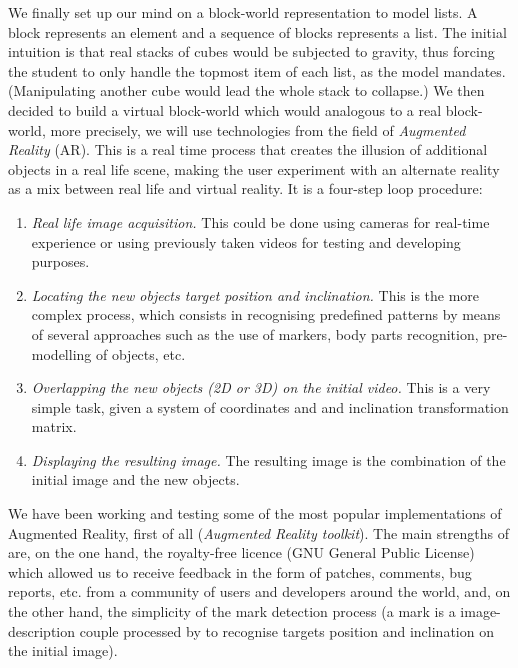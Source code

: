 We finally set up our mind on a block\hyp{}world representation to
model lists. A block represents an element and a sequence of blocks
represents a list. The initial intuition is that real stacks of cubes
would be subjected to gravity, thus forcing the student to only handle
the topmost item of each list, as the model mandates. (Manipulating
another cube would lead the whole stack to collapse.) We then decided
to build a virtual block\hyp{}world which would analogous to a real
block\hyp{}world, more precisely, we will use technologies from the
field of \emph{Augmented Reality} (AR). This is a real time process
that creates the illusion of additional objects in a real life scene,
making the user experiment with an alternate reality as a mix between
real life and virtual reality. It is a four\hyp{}step loop procedure:
\begin{enumerate}
	
	\item \emph{Real life image acquisition.} This could be done using
      cameras for real\hyp{}time experience or using previously taken
      videos for testing and developing purposes.
	
	\item \emph{Locating the new objects target position and
      inclination.} This is the more complex process, which consists
      in recognising predefined patterns by means of several
      approaches such as the use of markers, body parts recognition,
      pre\hyp{}modelling of objects, etc.
	
	\item \emph{Overlapping the new objects (2D or 3D) on the initial
      video.} This is a very simple task, given a system of
      coordinates and and inclination transformation matrix.
	
	\item \emph{Displaying the resulting image.} The resulting image
      is the combination of the initial image and the new objects.
	
\end{enumerate}
We have been working and testing some of the most popular
implementations of Augmented Reality, first of all \ARtoolkit
(\emph{Augmented Reality toolkit}). The main strengths of \ARtoolkit
are, on the one hand, the royalty\hyp{}free licence (GNU General
Public License) which allowed us to receive feedback in the form of
patches, comments, bug reports, etc. from a community of users and
developers around the world, and, on the other hand, the simplicity of
the mark detection process (a mark is a image\hyp{}description couple
processed by \ARtoolkit to recognise targets position and inclination
on the initial image).

